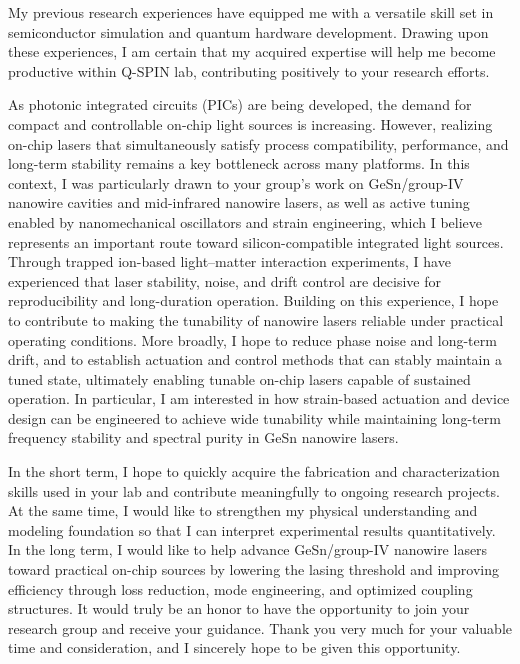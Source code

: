 \documentclass[11pt, a4paper]{awesome-cv}
\begin{document}
\begin{cvletter}
    \color{darktext}
    My previous research experiences have equipped me with a versatile skill set in semiconductor simulation and quantum hardware development. Drawing upon these experiences, I am certain that my acquired expertise will help me become productive within Q-SPIN lab, contributing positively to your research efforts.
    
    As photonic integrated circuits (PICs) are being developed, the demand for compact and controllable on-chip light sources is increasing. However, realizing on-chip lasers that simultaneously satisfy process compatibility, performance, and long-term stability remains a key bottleneck across many platforms. In this context, I was particularly drawn to your group’s work on GeSn/group-IV nanowire cavities and mid-infrared nanowire lasers, as well as active tuning enabled by nanomechanical oscillators and strain engineering, which I believe represents an important route toward silicon-compatible integrated light sources. Through trapped ion-based light–matter interaction experiments, I have experienced that laser stability, noise, and drift control are decisive for reproducibility and long-duration operation. Building on this experience, I hope to contribute to making the tunability of nanowire lasers reliable under practical operating conditions. More broadly, I hope to reduce phase noise and long-term drift, and to establish actuation and control methods that can stably maintain a tuned state, ultimately enabling tunable on-chip lasers capable of sustained operation. In particular, I am interested in how strain-based actuation and device design can be engineered to achieve wide tunability while maintaining long-term frequency stability and spectral purity in GeSn nanowire lasers.

    In the short term, I hope to quickly acquire the fabrication and characterization skills used in your lab and contribute meaningfully to ongoing research projects. At the same time, I would like to strengthen my physical understanding and modeling foundation so that I can interpret experimental results quantitatively. In the long term, I would like to help advance GeSn/group-IV nanowire lasers toward practical on-chip sources by lowering the lasing threshold and improving efficiency through loss reduction, mode engineering, and optimized coupling structures. It would truly be an honor to have the opportunity to join your research group and receive your guidance. Thank you very much for your valuable time and consideration, and I sincerely hope to be given this opportunity.
    
\end{cvletter}


\makeletterclosing
\end{document}
